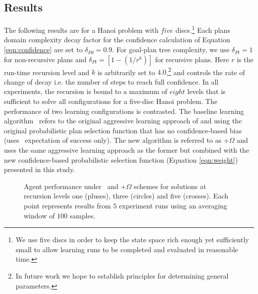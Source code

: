 
\subsection{Results}

The following results are for a Hanoi problem with $five$ discs.\footnote{We use five discs in order to keep the state space rich enough yet sufficiently small to allow learning runs to be completed and evaluated in reasonable time.} Each plans domain complexity decay factor for the confidence calculation of Equation \ref{eqn:confidence} are set to $\delta_{Pd} = 0.9$. For goal-plan tree complexity, we use $\delta_{Pt} =1$ for non-recursive plans and $\delta_{Pt} =\left[1-(1/r^k)\right]$ for recursive plans. Here $r$ is the run-time recursion level and $k$ is arbitrarily set to $4.0$,\footnote{In future work we hope to establish principles for determining general parameters.} and controls the rate of change of decay i.e. the number of steps to reach full confidence. In all experiments, the recursion is bound to a maximum of $eight$ levels that is sufficient to solve all configurations for a five-disc Hanoi problem. The performance of two learning configurations is contrasted. The baseline learning algorithm \CL\ refers to the original aggressive learning approach of \cite{Airiau:IJAT:09} and \cite{Singh:AAMAS10} using the original probabilistic plan selection function that has no confidence-based bias (uses \dt\ expectation of success only). The new algorithm is referred to as \CL+$\Omega$ and uses the same aggressive learning approach as the former but combined with the new confidence-based probabilistic selection function (Equation \ref{eqn:weight}) presented in this study.

\begin{figure*}[t]
\begin{center}
\subfigure[\CL]{\label{fig:result-levelsA}
\resizebox{.35\textwidth}{!}{}
}
\qquad
\subfigure[\CL+$\Omega$]{\label{fig:result-levelsB}
\resizebox{.35\textwidth}{!}{}
}
\caption{Agent performance under \CL\ and \CL+$\Omega$ schemes for solutions at recursion levels one (pluses), three (circles) and five (crosses). Each point represents results from $5$ experiment runs using an averaging window of $100$ samples.}
\label{fig:result-levels}
\end{center}
\end{figure*}

